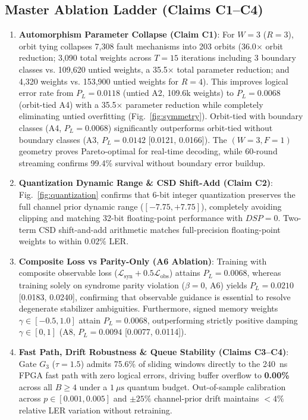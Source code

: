 \documentclass[journal]{IEEEtran}
\begin{document}
\subsection{Master Ablation Ladder (Claims C1--C4)}
\begin{enumerate}
    \item \textbf{Automorphism Parameter Collapse (Claim C1)}: For $W=3$ ($R=3$), orbit tying collapses 7,308 fault mechanisms into 203 orbits (36.0$\times$ orbit reduction; 3,090 total weights across $T=15$ iterations including 3 boundary classes vs. 109,620 untied weights, a 35.5$\times$ total parameter reduction; and 4,320 weights vs. 153,900 untied weights for $R=4$). This improves logical error rate from $P_L = 0.0118$ (untied A2, 109.6k weights) to $P_L = 0.0068$ (orbit-tied A4) with a 35.5$\times$ parameter reduction while completely eliminating untied overfitting (Fig.~\ref{fig:symmetry}). Orbit-tied with boundary classes (A4, $P_L = 0.0068$) significantly outperforms orbit-tied without boundary classes (A3, $P_L = 0.0142$ [0.0121, 0.0166]). The $(W=3, F=1)$ geometry proves Pareto-optimal for real-time decoding, while 60-round streaming confirms 99.4\% survival without boundary error buildup.
    \item \textbf{Quantization Dynamic Range \& CSD Shift-Add (Claim C2)}: Fig.~\ref{fig:quantization} confirms that 6-bit integer quantization preserves the full channel prior dynamic range ($[-7.75, +7.75]$), completely avoiding clipping and matching 32-bit floating-point performance with $DSP=0$. Two-term CSD shift-and-add arithmetic matches full-precision floating-point weights to within $0.02\%$ LER.
    \item \textbf{Composite Loss vs Parity-Only (A6 Ablation)}: Training with composite observable loss ($\mathcal{L}_{\text{syn}} + 0.5\mathcal{L}_{\text{obs}}$) attains $P_L = 0.0068$, whereas training solely on syndrome parity violation ($\beta = 0$, A6) yields $P_L = 0.0210$ [0.0183, 0.0240], confirming that observable guidance is essential to resolve degenerate stabilizer ambiguities. Furthermore, signed memory weights $\gamma \in [-0.5, 1.0]$ attain $P_L = 0.0068$, outperforming strictly positive damping $\gamma \in [0, 1]$ (A8, $P_L = 0.0094$ [0.0077, 0.0114]).
    \item \textbf{Fast Path, Drift Robustness \& Queue Stability (Claims C3--C4)}: Gate $G_3$ ($\tau=1.5$) admits 75.6\% of sliding windows directly to the 240~ns FPGA fast path with zero logical errors, driving buffer overflow to \textbf{0.00\%} across all $B \ge 4$ under a $1~\mu\text{s}$ quantum budget. Out-of-sample calibration across $p \in [0.001, 0.005]$ and $\pm 25\%$ channel-prior drift maintains $< 4\%$ relative LER variation without retraining.

\end{enumerate}
\end{document}
